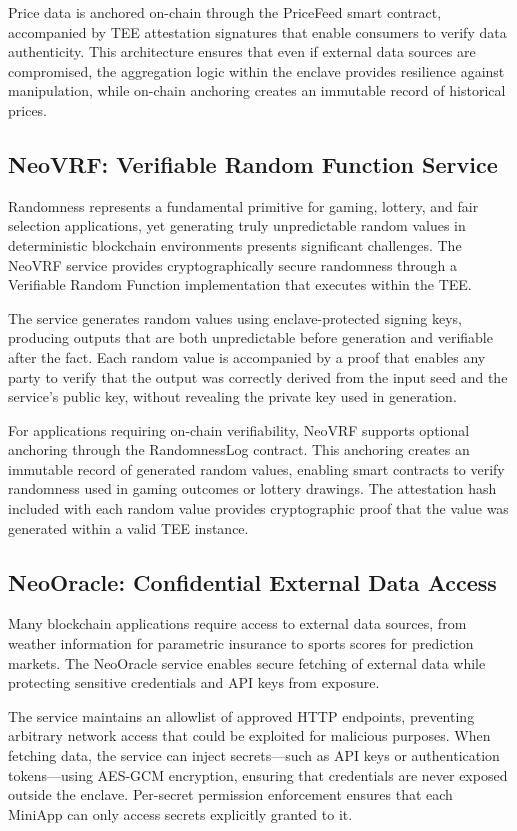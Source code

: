 \documentclass[11pt,a4paper]{article}
\begin{document}
Price data is anchored on-chain through the PriceFeed smart contract, accompanied by TEE attestation signatures that enable consumers to verify data authenticity. This architecture ensures that even if external data sources are compromised, the aggregation logic within the enclave provides resilience against manipulation, while on-chain anchoring creates an immutable record of historical prices.

\subsection{NeoVRF: Verifiable Random Function Service}

Randomness represents a fundamental primitive for gaming, lottery, and fair selection applications, yet generating truly unpredictable random values in deterministic blockchain environments presents significant challenges. The NeoVRF service provides cryptographically secure randomness through a Verifiable Random Function implementation that executes within the TEE.

The service generates random values using enclave-protected signing keys, producing outputs that are both unpredictable before generation and verifiable after the fact. Each random value is accompanied by a proof that enables any party to verify that the output was correctly derived from the input seed and the service's public key, without revealing the private key used in generation.

For applications requiring on-chain verifiability, NeoVRF supports optional anchoring through the RandomnessLog contract. This anchoring creates an immutable record of generated random values, enabling smart contracts to verify randomness used in gaming outcomes or lottery drawings. The attestation hash included with each random value provides cryptographic proof that the value was generated within a valid TEE instance.

\subsection{NeoOracle: Confidential External Data Access}

Many blockchain applications require access to external data sources, from weather information for parametric insurance to sports scores for prediction markets. The NeoOracle service enables secure fetching of external data while protecting sensitive credentials and API keys from exposure.

The service maintains an allowlist of approved HTTP endpoints, preventing arbitrary network access that could be exploited for malicious purposes. When fetching data, the service can inject secrets---such as API keys or authentication tokens---using AES-GCM encryption, ensuring that credentials are never exposed outside the enclave. Per-secret permission enforcement ensures that each MiniApp can only access secrets explicitly granted to it.
\end{document}
